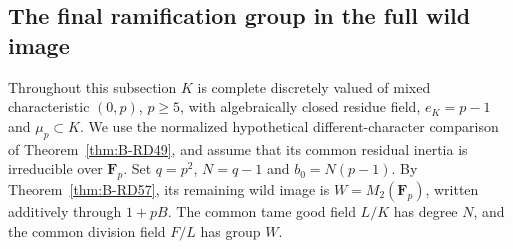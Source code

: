 \subsection{The final ramification group in the full wild image}

Throughout this subsection $K$ is complete discretely valued of mixed
characteristic $(0,p)$, $p\ge5$, with algebraically closed residue field,
$e_K=p-1$ and $\mu_p\subset K$. We use the normalized hypothetical
different-character comparison of Theorem~\ref{thm:B-RD49}, and assume
that its common residual inertia is irreducible over $\mathbf F_p$.
Set $q=p^2$, $N=q-1$ and $b_0=N(p-1)$. By
Theorem~\ref{thm:B-RD57}, its remaining wild image is
$W=M_2(\mathbf F_p)$, written additively through $1+pB$.
The common tame good field $L/K$ has degree $N$, and the common
division field $F/L$ has group $W$.


